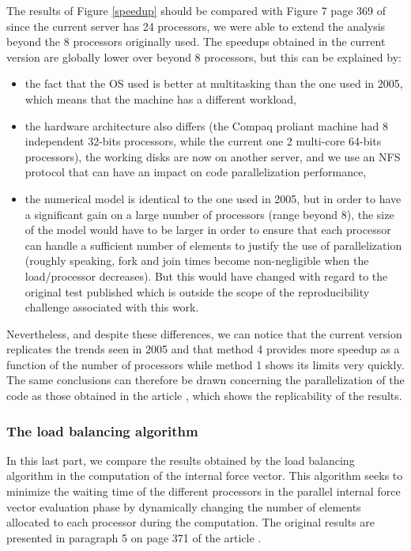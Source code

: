 The results of Figure \ref{speedup} should be compared with Figure 7 page 369 of \cite{Pantale:2005} since the current server has 24 processors, we were able to extend the analysis beyond the 8 processors originally used. The speedups obtained in the current version are globally lower over beyond 8 processors, but this can be explained by:
\begin{itemize}
\item the fact that the OS used is better at multitasking than the one used in 2005, which means that the machine has a different workload,
\item the hardware architecture also differs (the Compaq proliant machine had 8 independent 32-bits processors, while the current one 2 multi-core 64-bits processors), the working disks are now on another server, and we use an NFS protocol that can have an impact on code parallelization performance,
\item the numerical model is identical to the one used in 2005, but in order to have a significant gain on a large number of processors (range beyond 8), the size of the model would have to be larger in order to ensure that each processor can handle a sufficient number of elements to justify the use of parallelization (roughly speaking, fork and join times become non-negligible when the load/processor decreases). But this would have changed with regard to the original test published which is outside the scope of the reproducibility challenge associated with this work.
\end{itemize}
Nevertheless, and despite these differences, we can notice that the current version replicates the trends seen in 2005 and that method 4 provides more speedup as a function of the number of processors while method 1 shows its limits very quickly. The same conclusions can therefore be drawn concerning the parallelization of the code as those obtained in the article \cite{Pantale:2005}, which shows the replicability of the results.

\subsubsection{The load balancing algorithm}

In this last part, we compare the results obtained by the load balancing algorithm in the computation of the internal force vector. This algorithm seeks to minimize the waiting time of the different processors in the parallel internal force vector evaluation phase by dynamically changing the number of elements allocated to each processor during the computation. The original results are presented in paragraph 5 on page 371 of the article \cite{Pantale:2005}.


